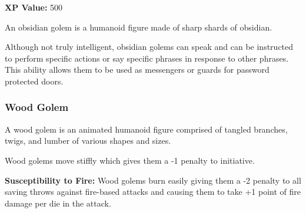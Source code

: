 \begin{multicols*}{2}
{\textbf{XP Value:} 500}

An obsidian golem is a humanoid figure made of sharp shards of obsidian.

Although not truly intelligent, obsidian golems can speak and can be instructed to perform specific actions or say specific phrases in response to other phrases. This ability allows them to be used as messengers or guards for password protected doors.

\subsubsection{Wood Golem}

A wood golem is an animated humanoid figure comprised of tangled branches, twigs, and lumber of various shapes and sizes.

Wood golems move stiffly which gives them a -1 penalty to initiative.

\textbf{Susceptibility to Fire:} Wood golems burn easily giving them a -2 penalty to all saving throws against fire-based attacks and causing them to take +1 point of fire damage per die in the attack.


\end{multicols*}
